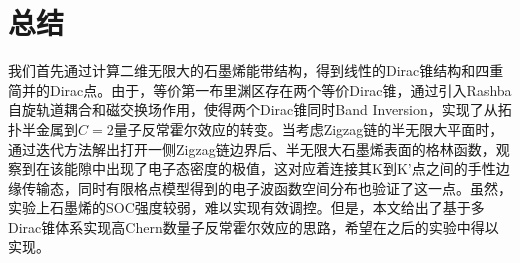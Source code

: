     \section{总结}\label{sec:summary}
    我们首先通过计算二维无限大的石墨烯能带结构，得到线性的Dirac锥结构和四重简并的Dirac点。由于，等价第一布里渊区存在两个等价Dirac锥，通过引入Rashba自旋轨道耦合和磁交换场作用，使得两个Dirac锥同时Band Inversion，实现了从拓扑半金属到$C=2$量子反常霍尔效应的转变。当考虑Zigzag链的半无限大平面时，通过迭代方法解出打开一侧Zigzag链边界后、半无限大石墨烯表面的格林函数，观察到在该能隙中出现了电子态密度的极值，这对应着连接其K到K’点之间的手性边缘传输态，同时有限格点模型得到的电子波函数空间分布也验证了这一点。虽然，实验上石墨烯的SOC强度较弱，难以实现有效调控。但是，本文给出了基于多Dirac锥体系实现高Chern数量子反常霍尔效应的思路，希望在之后的实验中得以实现。
